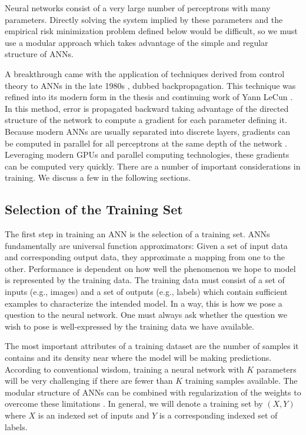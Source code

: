 \documentclass[10pt]{extarticle}
\begin{document}
Neural networks consist of a very large number of perceptrons with many parameters. Directly solving the system implied by these parameters and the empirical risk minimization problem defined below would be difficult, so we must use a
modular approach which takes advantage of the simple and regular structure of ANNs.

 A breakthrough came with the application of techniques derived from control theory to ANNs in the late 1980s \cite{rumelhart1986learning}, dubbed backpropagation. This technique was refined into its modern form in the thesis and continuing work of Yann LeCun \cite{lecun1988theoretical}. In this method, error is propagated backward taking advantage of the directed structure of the network to compute a gradient for each parameter defining it. Because modern ANNs are usually separated into discrete layers, gradients can be computed in parallel for all perceptrons at the same depth of the network
\cite{Bishop:2006:PRM:1162264}. Leveraging modern GPUs and parallel computing technologies, these gradients can be computed very quickly. There are a number of important considerations in training. We discuss a few in the following sections. 

\subsection{Selection of the Training Set}

The first step in training an ANN is the selection of a training set. ANNs fundamentally are universal function approximators: Given a set of input data and corresponding output data, they approximate a mapping from one to the other. Performance is dependent on how well the phenomenon we hope to model is represented by the training data. The training data must consist of a set of inputs (e.g., images) and a set of outputs (e.g., labels) which contain sufficient examples to characterize the intended model. In a way, this is how we pose a question to the neural network. One must always ask whether the question we wish to pose is well-expressed by the training data we have available. 

The most important attributes of a training dataset are the number of
samples it contains and its density near where the model will be making predictions. According to conventional wisdom, training a neural network with $K$ parameters
will be very challenging if there are fewer than $K$ training samples
available. The modular structure of ANNs can be combined with regularization of the weights to overcome these limitations \cite{liu2015very}. 
In general, we will denote a training set by $(X,Y)$ where $X$ is an indexed set of inputs and $Y$ is a corresponding indexed set of labels. 
\end{document}
